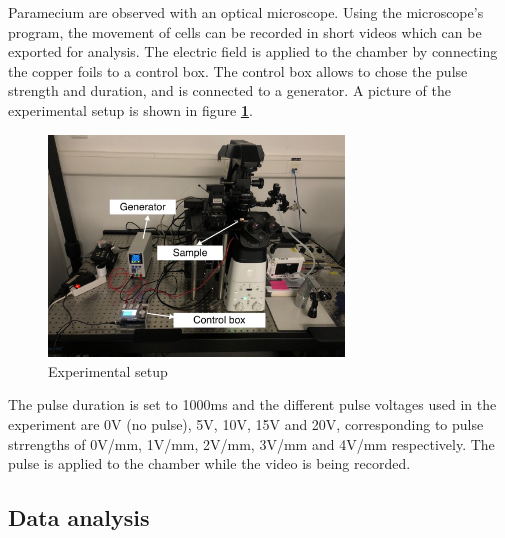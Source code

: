 Paramecium are observed with an optical microscope. Using the microscope's program, the movement of cells can be recorded in short videos which can be exported for analysis. The electric field is applied to the chamber by connecting the copper foils to a control box. The control box allows to chose the pulse strength and duration, and is connected to a generator. A picture of the experimental setup is shown in figure \textbf{\ref{fig:setup}}.
\begin{figure}[H]
\centering 
\captionsetup{width=0.9\linewidth, justification=centering}
\includegraphics[width=0.7\textwidth]{Figures/gros_setup.jpeg}
\caption{Experimental setup}
\label{fig:setup}
\end{figure}    
The pulse duration is set to 1000ms and the different pulse voltages used in the experiment are 0V (no pulse), 5V, 10V, 15V and 20V, corresponding to pulse strrengths of 0V/mm, 1V/mm, 2V/mm, 3V/mm and 4V/mm respectively. The pulse is applied to the chamber while the video is being recorded. 

\subsection{Data analysis}

